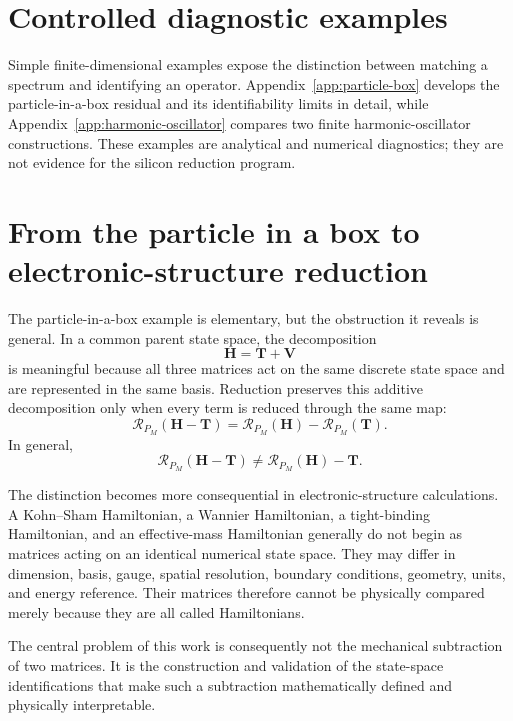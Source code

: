 \section{Controlled diagnostic examples}


Simple finite-dimensional examples expose the distinction between matching a
spectrum and identifying an operator. Appendix~\ref{app:particle-box} develops
the particle-in-a-box residual and its identifiability limits in detail, while
Appendix~\ref{app:harmonic-oscillator} compares two finite harmonic-oscillator
constructions. These examples are analytical and numerical diagnostics; they
are not evidence for the silicon reduction program.

\section{From the particle in a box to electronic-structure reduction}

The particle-in-a-box example is elementary, but the obstruction it reveals is
general. In a common parent state space, the decomposition
\begin{equation}
    \mathbf H=\mathbf T+\mathbf V
\end{equation}
is meaningful because all three matrices act on the same discrete state space
and are represented in the same basis. Reduction preserves this additive
decomposition only when every term is reduced through the same map:
\begin{equation}
    \mathcal R_{P_M}(\mathbf H-\mathbf T)
    =
    \mathcal R_{P_M}(\mathbf H)
    -
    \mathcal R_{P_M}(\mathbf T).
\end{equation}
In general,
\begin{equation}
    \mathcal R_{P_M}(\mathbf H-\mathbf T)
    \neq
    \mathcal R_{P_M}(\mathbf H)-\mathbf T.
\end{equation}

The distinction becomes more consequential in electronic-structure
calculations. A Kohn--Sham Hamiltonian, a Wannier Hamiltonian, a tight-binding
Hamiltonian, and an effective-mass Hamiltonian generally do not begin as
matrices acting on an identical numerical state space. They may differ in
dimension, basis, gauge, spatial resolution, boundary conditions, geometry,
units, and energy reference. Their matrices therefore cannot be physically
compared merely because they are all called Hamiltonians.

The central problem of this work is consequently not the mechanical
subtraction of two matrices. It is the construction and validation of the
state-space identifications that make such a subtraction mathematically
defined and physically interpretable.

